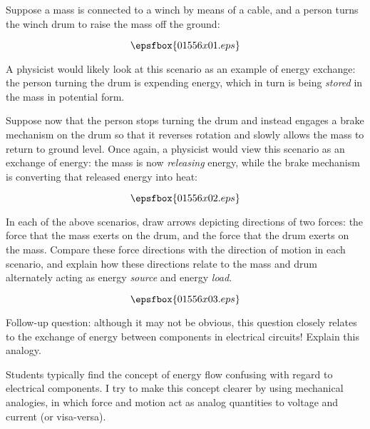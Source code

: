 

Suppose a mass is connected to a winch by means of a cable, and a person turns the winch drum to raise the mass off the ground:

$$\epsfbox{01556x01.eps}$$

A physicist would likely look at this scenario as an example of energy exchange: the person turning the drum is expending energy, which in turn is being {\it stored} in the mass in potential form.

Suppose now that the person stops turning the drum and instead engages a brake mechanism on the drum so that it reverses rotation and slowly allows the mass to return to ground level.  Once again, a physicist would view this scenario as an exchange of energy: the mass is now {\it releasing} energy, while the brake mechanism is converting that released energy into heat:

$$\epsfbox{01556x02.eps}$$

In each of the above scenarios, draw arrows depicting directions of two forces: the force that the mass exerts on the drum, and the force that the drum exerts on the mass.  Compare these force directions with the direction of motion in each scenario, and explain how these directions relate to the mass and drum alternately acting as energy {\it source} and energy {\it load}.







$$\epsfbox{01556x03.eps}$$

Follow-up question: although it may not be obvious, this question closely relates to the exchange of energy between components in electrical circuits!  Explain this analogy.







Students typically find the concept of energy flow confusing with regard to electrical components.  I try to make this concept clearer by using mechanical analogies, in which force and motion act as analog quantities to voltage and current (or visa-versa).




